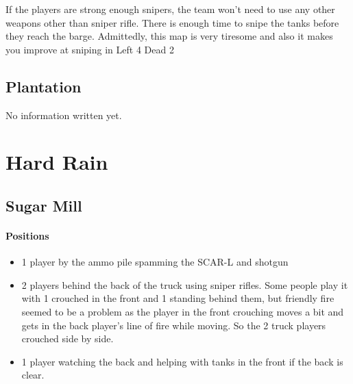 If the players are strong enough snipers, the team won't need to use any other weapons other than sniper rifle. There is enough time to snipe the tanks before they reach the barge. Admittedly, this map is very tiresome and also it makes you improve at sniping in Left 4 Dead 2

\subsection{Plantation}
No information written yet.

\section{Hard Rain}

\subsection{Sugar Mill}
\paragraph{Positions}
\begin{itemize}
\item 1 player by the ammo pile spamming the SCAR-L and shotgun
\item 2 players behind the back of the truck using sniper rifles. Some people play it with 1 crouched in the front and 1 standing behind them, but friendly fire seemed to be a problem as the player in the front crouching moves a bit and gets in the back player's line of fire while moving. So the 2 truck players crouched side by side.
\item 1 player watching the back and helping with tanks in the front if the back is clear.
\end{itemize}


